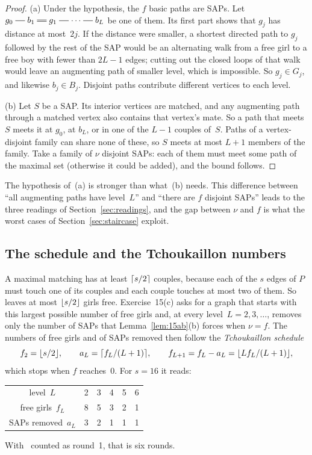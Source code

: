 \begin{proof}
(a) Under the hypothesis, the $f$ basic paths are SAPs. Let
$g_0\sg b_1\db g_1\sg\cdots\sg b_L$ be one of them. Its first part shows
that $g_j$ has distance at most~$2j$. If the distance were smaller, a
shortest directed path to $g_j$ followed by the rest of the SAP would be an
alternating walk from a free girl to a free boy with fewer than $2L-1$
edges; cutting out the closed loops of that walk would leave an
augmenting path of smaller level, which is impossible. So $g_j\in G_j$,
and likewise $b_j\in B_j$. Disjoint paths contribute different vertices
to each level.

(b) Let $S$ be a SAP. Its interior vertices are matched, and any
augmenting path through a matched vertex also contains that vertex's
mate. So a path that meets $S$ meets it at $g_0$, at $b_L$, or in one
of the $L-1$ couples of~$S$. Paths of a vertex-disjoint family can
share none of these, so $S$ meets at most $L+1$ members of the family.
Take a family of $\nu$ disjoint SAPs: each of them must meet some path of
the maximal set (otherwise it could be added), and the bound follows.
\end{proof}

The hypothesis of~(a) is stronger than what~(b) needs. This difference
between ``all augmenting paths have level~$L$'' and ``there are $f$
disjoint SAPs'' leads to the three readings of Section~\ref{sec:readings},
and the gap between $\nu$ and $f$ is what the worst cases of
Section~\ref{sec:staircase} exploit.

\subsection{The schedule and the Tchoukaillon numbers}
\label{sec:schedule}

A maximal matching has at least $\lceil s/2\rceil$ couples, because each of
the $s$ edges of $P$ must touch one of its couples and each couple
touches at most two of them. So~ leaves at most $\lfloor s/2\rfloor$ girls
free. Exercise~15(c) asks for a graph that starts with this largest
possible number of free girls and, at every level~$L=2,3,\ldots$,
removes only the number of SAPs that Lemma~\ref{lem:15ab}(b) forces when
$\nu=f$. The numbers of free girls and of SAPs removed then follow the
\emph{Tchoukaillon schedule}
\begin{equation}
  f_2=\lfloor s/2\rfloor,\qquad a_L=\lceil f_L/(L+1)\rceil,\qquad
  f_{L+1}=f_L-a_L=\lfloor Lf_L/(L+1)\rfloor,
  \label{eq:schedule}
\end{equation}
which stops when $f$ reaches~0. For $s=16$ it reads:
\begin{center}
\begin{tabular}{c|ccccc}
\toprule
level~$L$ & 2&3&4&5&6\\
free girls~$f_L$ & 8&5&3&2&1\\
SAPs removed~$a_L$ & 3&2&1&1&1\\
\bottomrule
\end{tabular}
\end{center}
With~ counted as round~1, that is six rounds.

